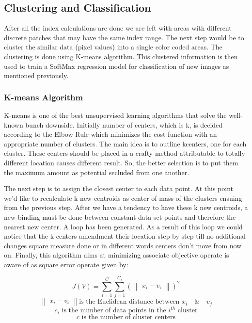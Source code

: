 \subsection{Clustering and Classification}
After all the index calculations are done we are left with areas with different discrete patches that may have the same index range. The next step would be to cluster the similar data (pixel values) into a single color coded areas. The clustering is done using K-means algorithm. This clustered information is then used to train a SoftMax regression model for classification of new images as mentioned previously.

\subsubsection{K-means Algorithm}
K-means is one of the best unsupervised learning algorithms that solve the well-known bunch downside. Initially number of centers, which is k, is decided according to the Elbow Rule which minimizes the cost function with an appropriate number of clusters. The main idea is to outline kcenters, one for each cluster. These centers should be placed in a crafty method attributable to totally different location causes different result. So, the better selection is to put them the maximum amount as potential secluded from one another.

The next step is to assign the closest center to each data point. At this point we'd like to recalculate k new centroids as center of mass of the clusters ensuing from the previous step. After we have a tendency to have these k new centroids, a new binding must be done between constant data set points and therefore the nearest new center. A loop has been generated. As a result of this loop we could notice that the k centers amendment their location step by step till no additional changes square measure done or in different words centers don't move from now on. Finally, this algorithm aims at minimizing associate objective operate is aware of as square error operate given by:


\begin{equation} \label{eq: eq-3}
J(V) = \sum_{i=1}^{C}\sum_{j=1}^{C_i} (\begin{Vmatrix}x_i-v_i
\end{Vmatrix})^2
\end{equation}
\begin{equation*} 
\begin{Vmatrix}x_i-v_i

\end{Vmatrix} \text{is the Euclidean distance between } x_i \quad \& \quad v_j 
\end{equation*}
\begin{equation*} 
c_i \text{ is the number of data points in the $i_{}^{th}$ cluster}
\end{equation*}
\begin{equation*} 
c \text{ is the number of cluster centers}
\end{equation*}


